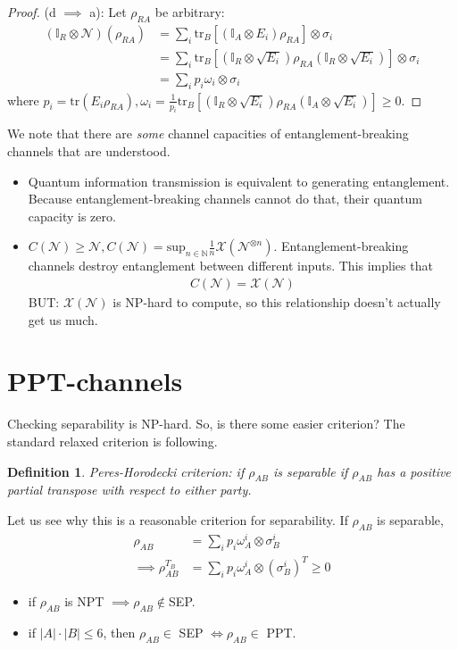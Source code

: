 \documentclass[10pt,oneside,longbibliography]{report}
\newtheorem{definition}{Definition}[section]
\begin{document}
\begin{proof}
 (d $\implies$ a): Let $\rho_{RA}$ be arbitrary: 
 \begin{align}
     (\mathbb{I}_R \otimes \mathcal{N})(\rho_{RA}) &= \sum_i \text{tr}_B \left[(\mathbb{I}_A \otimes E_i)\rho_{RA}\right]\otimes \sigma_i \\
     &= \sum_i \text{tr}_B \left[(\mathbb{I}_R \otimes \sqrt{E_i}) \rho_{RA}(\mathbb{I}_R \otimes \sqrt{E_i})\right] \otimes \sigma_i \\
     &= \sum_i p_i \omega_i \otimes \sigma_i
 \end{align}
 where $p_i = \text{tr}(E_i \rho_{RA}), \omega_i = \frac{1}{p_i} \text{tr}_B \left[(\mathbb{I}_R \otimes \sqrt{E_i})\rho_{RA} (\mathbb{I}_A \otimes \sqrt{E_i})\right]\geq 0$. 
\end{proof}

We note that there are \textit{some} channel capacities of entanglement-breaking channels that are understood.
\begin{itemize}
    \item Quantum information transmission is equivalent to generating entanglement. Because entanglement-breaking channels cannot do that, their quantum capacity is zero.
    \item $C(\mathcal{N}) \geq \mathcal{N}, C(\mathcal{N})=\text{sup}_{n \in \mathbb{N}} \frac{1}{n} \mathcal{X}(\mathcal{N}^{\otimes n})$. Entanglement-breaking channels destroy entanglement between different inputs. This implies that 
    \begin{align}
        C(\mathcal{N}) = \mathcal{X}(\mathcal{N})
    \end{align}
    BUT: $\mathcal{X}(\mathcal{N})$ is NP-hard to compute, so this relationship doesn't actually get us much.
\end{itemize}
\section{PPT-channels}
Checking separability is NP-hard. So, is there some easier criterion? The standard relaxed criterion is following.

\begin{definition}
Peres-Horodecki criterion: if $\rho_{AB}$ is separable if $\rho_{AB}$ has a positive partial transpose with respect to either party.  
\end{definition}
Let us see why this is a reasonable criterion for separability. If $\rho_{AB}$ is separable, 
\begin{align}
    \rho_{AB} &= \sum_i p_i \omega_A^i \otimes \sigma_B^i \\
    \implies  \rho_{AB}^{T_B} &= \sum_i p_i \omega_A^i \otimes (\sigma_B^i)^T \geq 0
\end{align}
\begin{itemize}
    \item if $\rho_{AB}$ is NPT $\implies \rho_{AB} \notin$SEP. 
    \item if $|A|\cdot |B| \leq 6$, then $\rho_{AB} \in$ SEP $\Leftrightarrow \rho_{AB} \in$ PPT.  
\end{itemize}
\end{document}
